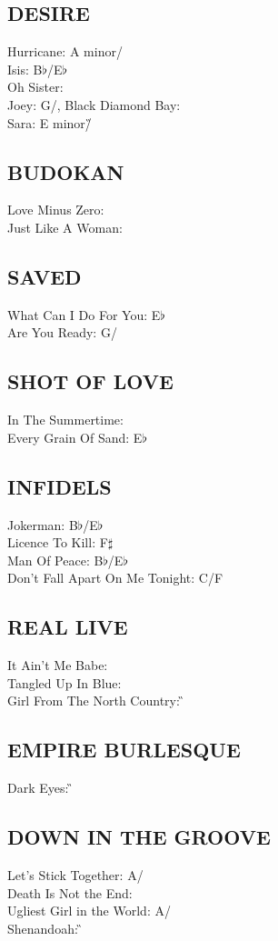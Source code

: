 \begin{articlelayout}
\subsection{DESIRE}
Hurricane: A minor/\C\\ Isis: B$\flat$/E$\flat$\\ Oh Sister: \G\\ Joey: G/\C,
Black Diamond Bay: \G\\ Sara: E minor/\G


\subsection{BUDOKAN}
Love Minus Zero: \D\\ Just Like A Woman: \E


\subsection{SAVED}
What Can I Do For You: E$\flat$\\ Are You Ready: G/\C


\subsection{SHOT OF LOVE}
In The Summertime: \A\\ Every Grain Of Sand: E$\flat$


\subsection{INFIDELS}
Jokerman: B$\flat$/E$\flat$\\ Licence To Kill: F$\sharp$\\ Man Of Peace: B$\flat$/E$\flat$\\ Don't Fall Apart On Me Tonight: C/F


\subsection{REAL LIVE}
It Ain't Me Babe: \G\\ Tangled Up In Blue: \A\\ Girl From The North Country: \G


\subsection{EMPIRE BURLESQUE}
Dark Eyes: \G


\subsection{DOWN IN THE GROOVE}
Let's Stick Together: A/\D\\ Death Is Not the End: \A\\ Ugliest Girl in the World: A/\D\\ Shenandoah: \G



\end{articlelayout}
